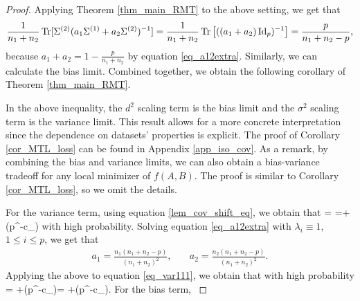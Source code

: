 \begin{proof}
Applying Theorem \ref{thm_main_RMT} to the above setting, we get that
	\begin{align*}
		\frac{1}{n_1 + n_2} \tr[\Sigma^{(2)} (a_1\Sigma^{(1)} + a_2\Sigma^{(2)})^{-1}]
		= \frac{1}{n_1 + n_2} \bigtr{((a_1 + a_2)\id_p)^{-1}}
		= \frac{p}{n_1 + n_2 - p},
	\end{align*}
	because $a_1 + a_2 = 1 - \frac{p}{n_1 + n_2}$ by equation \eqref{eq_a12extra}.
	Similarly, we can calculate the bias limit.
	Combined together, we obtain the following corollary of Theorem \ref{thm_main_RMT}.

In the above inequality, the $d^2$ scaling term is the bias limit and the $\sigma^2$ scaling term is the variance limit.
This result allows for a more concrete interpretation since the dependence on datasets' properties is explicit.
The proof of Corollary \ref{cor_MTL_loss} can be found in Appendix \ref{app_iso_cov}.
As a remark, %
by combining the bias and variance limits, we can also obtain a bias-variance tradeoff for any local minimizer of $f(A, B)$.
The proof is similar to Corollary \ref{cor_MTL_loss}, so we omit the details.

{\cor
For the variance term, using equation \eqref{lem_cov_shift_eq}, we obtain that
\be\label{eq_var111} = \tr{}=+\OO(p^{-c_\varphi})\ee
with high probability. Solving equation \eqref{eq_a12extra} with $\lambda_i\equiv 1$, $1\le i\le p$, we get that
	\begin{align}
		 a_1 = \frac{n_1(n_1 + n_2 - p)}{(n_1 + n_2)^2} ,\quad
		& a_2 = \frac{n_2(n_1 + n_2 - p)}{(n_1 +n_2)^2} . \label{simplesovlea12}
			\end{align}
Applying the above to equation \eqref{eq_var111}, we obtain that with high probability
\be\label{eq_var112}  =  \cdot {}+\OO(p^{-c_\varphi})=  +\OO(p^{-c_\varphi}).\ee
For the bias term,
}



\end{proof}
